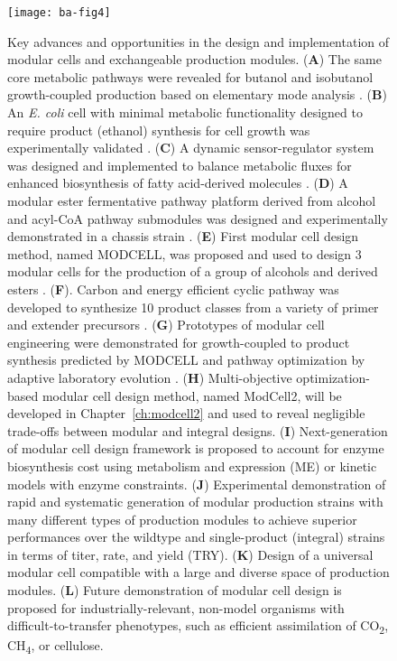 \begin{figure}[!p]
  \centering
  \texttt{[image: ba-fig4]}
    \caption[Key advances and opportunities in the design and
    implementation of modular cells and exchangeable production modules]{Key advances and opportunities in the design and
implementation of modular cells and exchangeable production modules.
    (\textbf{A}) The same core metabolic pathways were revealed for butanol
and isobutanol growth-coupled production based on elementary mode
analysis \citep{trinh2012}. (\textbf{B}) An \emph{E. coli}
cell with minimal metabolic functionality designed to require product
(ethanol) synthesis for cell growth was experimentally validated
\citep{trinh2008}. (\textbf{C}) A dynamic sensor-regulator
system was designed and implemented to balance metabolic fluxes for
enhanced biosynthesis of fatty acid-derived molecules
\citep{zhang2012}. (\textbf{D}) A modular ester fermentative
pathway platform derived from alcohol and acyl-CoA pathway submodules
was designed and experimentally demonstrated in a chassis strain
\citep{layton2014}. (\textbf{E}) First modular cell design
method, named MODCELL, was proposed and used to design 3 modular cells
for the production of a group of alcohols and derived esters
\citep{trinh2015}. (\textbf{F}). Carbon and energy efficient
cyclic pathway was developed to synthesize 10 product classes from a
variety of primer and extender precursors \citep{cheong2016}.
(\textbf{G}) Prototypes of modular cell engineering were demonstrated
for growth-coupled to product synthesis predicted by MODCELL
\citep{trinh2015} and pathway optimization by adaptive
laboratory evolution \citep{wilbanks2017}. (\textbf{H})
Multi-objective optimization-based modular cell design method, named
ModCell2, will be developed in Chapter~\ref{ch:modcell2} and used to reveal negligible trade-offs
between modular and integral designs.
(\textbf{I}) Next-generation of modular cell design framework is
proposed to account for enzyme biosynthesis cost using metabolism and
expression (ME) or kinetic models with enzyme constraints. (\textbf{J})
Experimental demonstration of rapid and systematic generation of modular
production strains with many different types of production modules to
achieve superior performances over the wildtype and single-product
(integral) strains in terms of titer, rate, and yield (TRY).
(\textbf{K}) Design of a universal modular cell compatible with a large
and diverse space of production modules. (\textbf{L}) Future
demonstration of modular cell design is proposed for
industrially-relevant, non-model organisms with difficult-to-transfer
phenotypes, such as efficient assimilation of CO\textsubscript{2},
    CH\textsubscript{4}, or cellulose.}
    \label{fig:ba-fig4}
\end{figure}


